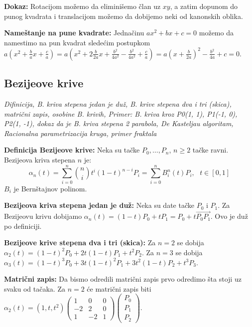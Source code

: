 \documentclass[12pt]{article}
\newcommand{\vek}[1]{\overrightarrow{#1}}
\begin{document}
\textbf{Dokaz:} Rotacijom možemo da eliminišemo član uz $xy$, a zatim dopunom
do punog kvadrata i translacijom možemo da dobijemo neki od kanonskih oblika.
\par

\textbf{Nameštanje na pune kvadrate:} Jednačinu $ax^2+bx+c=0$ možemo da
namestimo na pun kvadrat sledećim postupkom
$a(x^2+\frac{b}{a}x+\frac{c}{a})=a(x^2+2\frac{b}{2a}x+\frac{b^2}{4a^2}-\frac{b^2}{4a^2}+\frac{c}{a})
    =a(x+\frac{b}{2a})^2-\frac{b^2}{4a}+c=0$.

\subsection{Bezijeove krive}
\textit{Difinicija, B. kriva stepena jedan je duž, B. krive stepena dva i tri
    (skica), matrični zapis, osobine B. krivih, Primer: B. kriva kroz P0(1, 1),
    P1(-1, 0), P2(1, -1), dokaz da je B. kriva stepena 2 parabola, De Kasteljau
    algoritam, Racionalna parametrizacija kruga, primer fraktala}
\par
\vspace*{1cm}

\textbf{Definicija Bezijeove krive:} Neka su tačke $P_0,\dotsc,P_n$, $n\geq2$
tačke ravni. Bezijeova kriva stepena $n$ je:
$$\alpha_n(t)=\sum_{i=0}^{n}\binom{n}{i}t^i(1-t)^{n-i}P_i=\sum_{i=0}^{n}
    B^n_i(t)P_i,\text{\ }t\in[0,1]$$
$B_i$ je Bernštajnov polinom.
\par

\textbf{Bezijeova kriva stepena jedan je duž:} Neka su date tačke $P_0$ i
$P_1$. Za Bezijeovu krivu dobijamo
$\alpha_n(t)=(1-t)P_0+tP_1=P_0+t\vek{P_0P_1}$. Ovo je duž po definiciji.
\par

\textbf{Bezijeove krive stepena dva i tri (skica):} Za $n=2$ se dobija
$\alpha_2(t)=(1-t)^2P_0+2t(1-t)P_1+t^2P_2$. Za $n=3$ se dobija
$\alpha_3(t)=(1-t)^3P_0+3t(1-t)^2P_1+3t^2(1-t)P_2+t^3P_3$.
\par

\textbf{Matrični zapis:} Da bismo odredili matrični zapis prvo odredimo šta
stoji uz svaku od tačaka. Za $n=2$ će matrični zapis biti
$\alpha_2(t)=\left(1,t,t^2\right)\left(\begin{matrix}
            1  & 0  & 0 \\
            -2 & 2  & 0 \\
            1  & -2 & 1
        \end{matrix}\right)\left(\begin{matrix}
            P_0 \\
            P_1 \\
            P_2
        \end{matrix}\right)$.
\par
\end{document}
